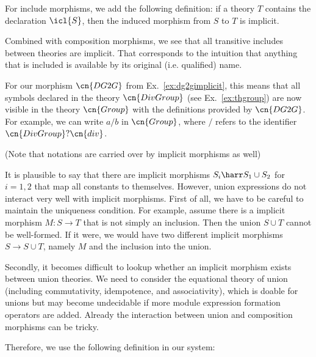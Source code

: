 \begin{example}\label{impl:incl}
For include morphisms, we add the following definition: if a theory $T$ contains the declaration $\icl{S}$, then the induced morphism from $S$ to $T$ is implicit.

Combined with composition morphisms, we see that all transitive includes between theories are implicit.
That corresponds to the intuition that anything that is included is available by its original (i.e. qualified) name.
\end{example}

\begin{example}
	For our morphism $\cn{DG2G}$ from Ex.~\ref{ex:dg2gimplicit}, this means that all symbols declared in the theory $\cn{DivGroup}$ (see Ex.~\ref{ex:thgroup}) are now visible in the theory $\cn{Group}$ with the definitions provided by $\cn{DG2G}$.
	For example, we can write $a/b$ in $\cn{Group}$, where $/$ refers to the identifier $\cn{DivGroup}?\cn{div}$.
	
	(Note that notations are carried over by implicit morphisms as well)
\end{example}

It is plausible to say that there are implicit morphisms $S_i\harr S_1\cup S_2$ for $i=1,2$ that map all constants to themselves.
However, union expressions do not interact very well with implicit morphisms.
First of all, we have to be careful to maintain the uniqueness condition.
For example, assume there is a implicit morphism $M:S\to T$ that is not simply an inclusion.
Then the union $S\cup T$ cannot be well-formed.
If it were, we would have two different implicit morphisms $S\to S\cup T$, namely $M$ and the inclusion into the union.

Secondly, it becomes difficult to lookup whether an implicit morphism exists between union theories.
We need to consider the equational theory of union (including commutativity, idempotence, and associativity), which is doable for unions but may become undecidable if more module expression formation operators are added.
Already the interaction between union and composition morphisms can be tricky.

Therefore, we use the following definition in our system:

